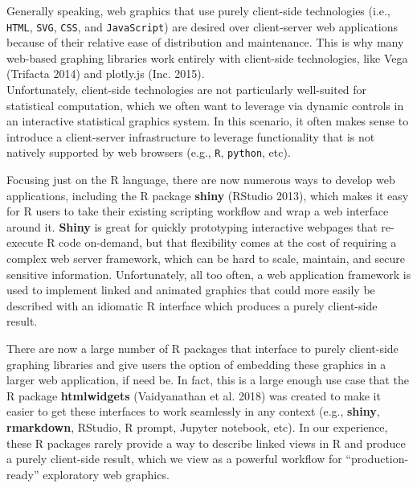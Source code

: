 \documentclass[12pt,]{article}
\theoremstyle{definition}
\theoremstyle{definition}
\theoremstyle{definition}
\theoremstyle{remark}
\begin{document}
Generally speaking, web graphics that use purely client-side
technologies (i.e., \texttt{HTML}, \texttt{SVG}, \texttt{CSS}, and
\texttt{JavaScript}) are desired over client-server web applications
because of their relative ease of distribution and maintenance. This is
why many web-based graphing libraries work entirely with client-side
technologies, like Vega (Trifacta 2014) and plotly.js (Inc. 2015).\\
Unfortunately, client-side technologies are not particularly well-suited
for statistical computation, which we often want to leverage via dynamic
controls in an interactive statistical graphics system. In this
scenario, it often makes sense to introduce a client-server
infrastructure to leverage functionality that is not natively supported
by web browsers (e.g., \texttt{R}, \texttt{python}, etc).

Focusing just on the R language, there are now numerous ways to develop
web applications, including the R package \textbf{shiny} (RStudio 2013),
which makes it easy for R users to take their existing scripting
workflow and wrap a web interface around it. \textbf{Shiny} is great for
quickly prototyping interactive webpages that re-execute R code
on-demand, but that flexibility comes at the cost of requiring a complex
web server framework, which can be hard to scale, maintain, and secure
sensitive information. Unfortunately, all too often, a web application
framework is used to implement linked and animated graphics that could
more easily be described with an idiomatic R interface which produces a
purely client-side result.

There are now a large number of R packages that interface to purely
client-side graphing libraries and give users the option of embedding
these graphics in a larger web application, if need be. In fact, this is
a large enough use case that the R package \textbf{htmlwidgets}
(Vaidyanathan et al. 2018) was created to make it easier to get these
interfaces to work seamlessly in any context (e.g., \textbf{shiny},
\textbf{rmarkdown}, RStudio, R prompt, Jupyter notebook, etc). In our
experience, these R packages rarely provide a way to describe linked
views in R and produce a purely client-side result, which we view as a
powerful workflow for ``production-ready'' exploratory web graphics.
\end{document}
